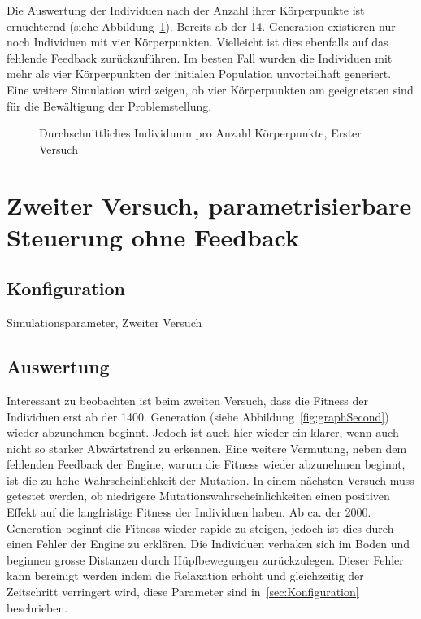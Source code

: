       Die Auswertung der Individuen nach der Anzahl ihrer Körperpunkte ist ernüchternd (siehe Abbildung~\ref{fig:graphBpFirst}).
      Bereits ab der 14. Generation existieren nur noch Individuen mit vier Körperpunkten.
      Vielleicht ist dies ebenfalls auf das fehlende Feedback zurückzuführen.
      Im besten Fall wurden die Individuen mit mehr als vier Körperpunkten der initialen Population unvorteilhaft generiert.
      Eine weitere Simulation wird zeigen,
      ob vier Körperpunkten am geeignetsten sind für die Bewältigung der Problemstellung.

      \begin{figure}
        
        \caption{Durchschnittliches Individuum pro Anzahl Körperpunkte, Erster Versuch\label{fig:graphBpFirst}}
      \end{figure}

  \section{Zweiter Versuch, parametrisierbare Steuerung ohne Feedback}

    \subsection{Konfiguration}

      \begin{table}[H]
        
        \caption{Simulationsparameter, Zweiter Versuch}
      \end{table}

    \subsection{Auswertung}

      Interessant zu beobachten ist beim zweiten Versuch,
      dass die Fitness der Individuen erst ab der 1400\@. Generation (siehe Abbildung~\ref{fig:graphSecond})
      wieder abzunehmen beginnt.
      Jedoch ist auch hier wieder ein klarer, wenn auch nicht so starker Abwärtstrend zu erkennen.
      Eine weitere Vermutung, neben dem fehlenden Feedback der Engine, warum die Fitness wieder abzunehmen beginnt,
      ist die zu hohe Wahrscheinlichkeit der Mutation.
      In einem nächsten Versuch muss getestet werden,
      ob niedrigere Mutationswahrscheinlichkeiten einen positiven Effekt auf die langfristige Fitness der Individuen haben.
      Ab ca\@. der 2000\@. Generation beginnt die Fitness wieder rapide zu steigen,
      jedoch ist dies durch einen Fehler der Engine zu erklären.
      Die Individuen verhaken sich im Boden und beginnen grosse Distanzen durch Hüpfbewegungen zurückzulegen.
      Dieser Fehler kann bereinigt werden indem die Relaxation erhöht und gleichzeitig der Zeitschritt verringert wird,
      diese Parameter sind in~\ref{sec:Konfiguration} beschrieben.

